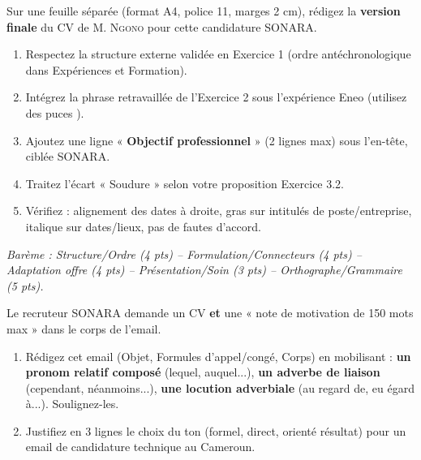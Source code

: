 \documentclass[11pt]{article}
\begin{document}
\begin{exercice}
Sur une feuille séparée (format A4, police 11, marges 2 cm), rédigez la \textbf{version finale} du CV de M. \textsc{Ngono} pour cette candidature SONARA.
\begin{enumerate}
    \item Respectez la structure externe validée en Exercice 1 (ordre antéchronologique dans Expériences et Formation).
    \item Intégrez la phrase retravaillée de l'Exercice 2 sous l'expérience Eneo (utilisez des puces \textbullet).
    \item Ajoutez une ligne « \textbf{Objectif professionnel} » (2 lignes max) sous l'en-tête, ciblée SONARA.
    \item Traitez l'écart « Soudure » selon votre proposition Exercice 3.2.
    \item Vérifiez : alignement des dates à droite, gras sur intitulés de poste/entreprise, italique sur dates/lieux, pas de fautes d'accord.
\end{enumerate}
\textit{Barème : Structure/Ordre (4 pts) -- Formulation/Connecteurs (4 pts) -- Adaptation offre (4 pts) -- Présentation/Soin (3 pts) -- Orthographe/Grammaire (5 pts).}
\end{exercice}

\begin{exercice}
Le recruteur SONARA demande un CV \textbf{et} une « note de motivation de 150 mots max » dans le corps de l'email.
\begin{enumerate}
    \item Rédigez cet email (Objet, Formules d'appel/congé, Corps) en mobilisant : \textbf{un pronom relatif composé} (lequel, auquel...), \textbf{un adverbe de liaison} (cependant, néanmoins...), \textbf{une locution adverbiale} (au regard de, eu égard à...). Soulignez-les.
    \item Justifiez en 3 lignes le choix du ton (formel, direct, orienté résultat) pour un email de candidature technique au Cameroun.
\end{enumerate}
\end{exercice}
\end{document}
